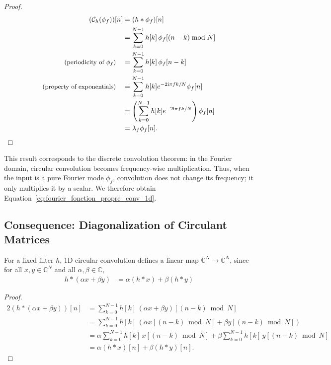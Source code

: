 \begin{proof}
\begin{alignat*}{2}
    (\mathcal{C}_h(\phi_f))[n] &= (h * \phi_f)[n] \\
    &= \sum_{k=0}^{N-1} h[k]\,\phi_f[(n-k) \bmod N] \\
    \text{\small (periodicity of $\phi_f$)} \quad &= \sum_{k=0}^{N-1} h[k]\,\phi_f[n-k] \\
    \text{\small (property of exponentials)} \quad &= \sum_{k=0}^{N-1} h[k] e^{-2\mathrm{i}\pi f k/N}\phi_f[n] \\
    &= \left(\sum_{k=0}^{N-1} h[k] e^{-2\mathrm{i}\pi f k/N}\right)\phi_f[n] \\
    &= \lambda_f \phi_f[n].
\end{alignat*}

\end{proof}

This result corresponds to the discrete convolution theorem: in the Fourier domain,
circular convolution becomes frequency-wise multiplication. Thus,
when the input is a pure Fourier mode \(\phi_f\), convolution does not change
its frequency; it only multiplies it by a scalar. We therefore obtain Equation~\ref{eq:fourier_fonction_propre_conv_1d}.

\subsection{Consequence: Diagonalization of Circulant Matrices}

For a fixed filter $h$, 1D circular convolution defines a linear map $\mathbb{C}^N \rightarrow \mathbb{C}^N$,
since for all $x, y \in \mathbb{C}^N$ and all $\alpha, \beta \in \mathbb{C}$,
\begin{align*}
h * (\alpha x + \beta y) &= \alpha (h * x) + \beta (h * y)
\end{align*}

\begin{proof}
\begin{alignat*}{2}
    (h * (\alpha x + \beta y))[n] &= \sum_{k=0}^{N-1} h[k]\,(\alpha x + \beta y)[(n-k) \bmod N]  \\
    &= \sum_{k=0}^{N-1} h[k]\,(\alpha x[(n-k) \bmod N] + \beta y[(n-k) \bmod N])  \\
    &= \alpha \sum_{k=0}^{N-1} h[k]\,x[(n-k) \bmod N] + \beta \sum_{k=0}^{N-1} h[k]\,y[(n-k) \bmod N]  \\
    &= \alpha (h * x)[n] + \beta (h * y)[n].
\end{alignat*}

\end{proof}

